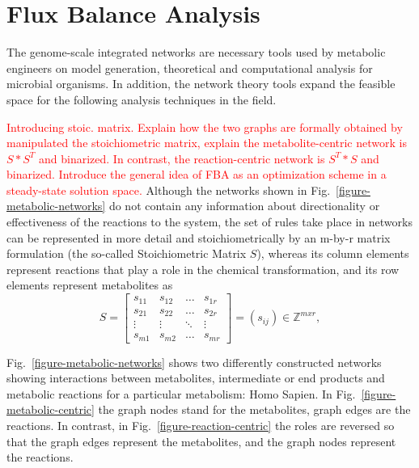 \section{Flux Balance Analysis}
The genome-scale integrated networks are necessary tools used by metabolic engineers on model generation, theoretical and computational analysis for microbial organisms. In addition, the network theory tools expand the feasible space for the following analysis techniques in the field. 

\textcolor{red}{Introducing stoic. matrix. Explain how the two graphs are formally obtained by manipulated the stoichiometric matrix, explain the metabolite-centric network is $S*S^{T}$ and binarized. In contrast, the reaction-centric network is $S^{T}*S$ and binarized. Introduce the general idea of FBA as an optimization scheme in a steady-state solution space.}
Although the networks shown in Fig.~\ref{figure-metabolic-networks} do not contain any information about directionality or effectiveness of the reactions to the system, the set of rules take place in networks can be represented in more detail and stoichiometrically by an m-by-r matrix formulation (the so-called Stoichiometric Matrix $S$), whereas its column elements represent reactions that play a role in the chemical transformation, and its row elements represent metabolites as
\begin{equation} \tag{1}
	S =  \begin{bmatrix} 
		s_{11} & s_{12} & \dots  & s_{1r}\\
		s_{21} & s_{22} & \dots  & s_{2r}\\
		\vdots & \vdots &\ddots & \vdots \\
		s_{m1} & s_{m2} & \dots & s_{mr} 
	\end{bmatrix}=(s_{ij})\in \mathbb{Z}^{mxr},
	\label{stoichio}
\end{equation}

Fig.~\ref{figure-metabolic-networks} shows two differently constructed networks showing interactions between metabolites, intermediate or end products and metabolic reactions for a particular metabolism: Homo Sapien. In Fig.~\ref{figure-metabolic-centric} the graph nodes stand for the metabolites, graph edges are the reactions. In contrast, in Fig.~\ref{figure-reaction-centric} the roles are reversed so that the graph edges represent the metabolites, and the graph nodes represent the reactions.



